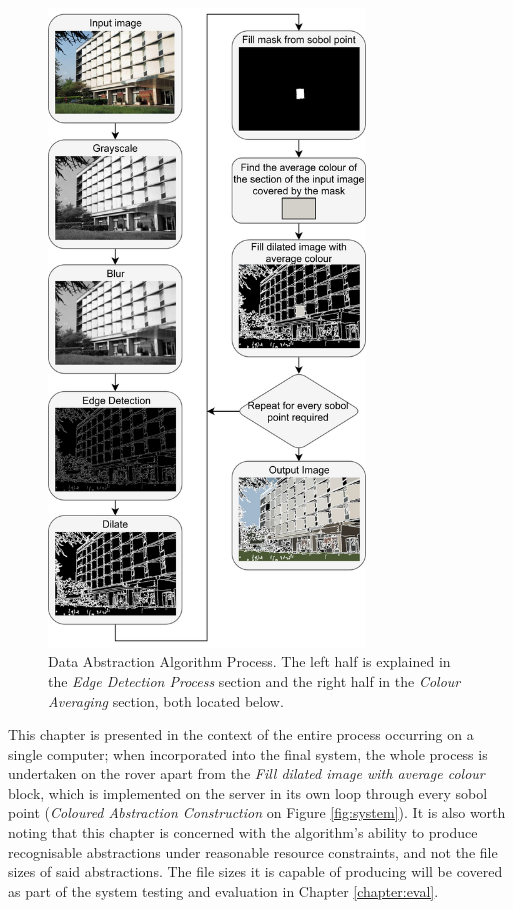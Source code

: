 \begin{figure}[H]
    \begin{center}
      \includegraphics[width=0.75\textwidth]{Figures/Abstraction.jpg}
      \caption[Data Abstraction Algorithm Process]{Data Abstraction Algorithm Process. The left half is explained in the \emph{Edge Detection Process} section and the right half in the \emph{Colour Averaging} section, both located below.}
      \label{fig:process}
    \end{center}
\end{figure}

This chapter is presented in the context of the entire process occurring on a single computer; when incorporated into the final system, the whole process is undertaken on the rover apart from the \emph{Fill dilated image with average colour} block, which is implemented on the server in its own loop through every sobol point (\emph{Coloured Abstraction Construction} on Figure \ref{fig:system}). It is also worth noting that this chapter is concerned with the algorithm's ability to produce recognisable abstractions under reasonable resource constraints, and not the file sizes of said abstractions. The file sizes it is capable of producing will be covered as part of the system testing and evaluation in Chapter \ref{chapter:eval}.

